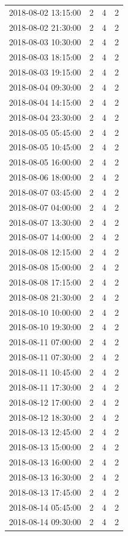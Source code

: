 \begin{tabular}{lrrr}
2018-08-02 13:15:00 & 2 & 4 & 2 \\
2018-08-02 21:30:00 & 2 & 4 & 2 \\
2018-08-03 10:30:00 & 2 & 4 & 2 \\
2018-08-03 18:15:00 & 2 & 4 & 2 \\
2018-08-03 19:15:00 & 2 & 4 & 2 \\
2018-08-04 09:30:00 & 2 & 4 & 2 \\
2018-08-04 14:15:00 & 2 & 4 & 2 \\
2018-08-04 23:30:00 & 2 & 4 & 2 \\
2018-08-05 05:45:00 & 2 & 4 & 2 \\
2018-08-05 10:45:00 & 2 & 4 & 2 \\
2018-08-05 16:00:00 & 2 & 4 & 2 \\
2018-08-06 18:00:00 & 2 & 4 & 2 \\
2018-08-07 03:45:00 & 2 & 4 & 2 \\
2018-08-07 04:00:00 & 2 & 4 & 2 \\
2018-08-07 13:30:00 & 2 & 4 & 2 \\
2018-08-07 14:00:00 & 2 & 4 & 2 \\
2018-08-08 12:15:00 & 2 & 4 & 2 \\
2018-08-08 15:00:00 & 2 & 4 & 2 \\
2018-08-08 17:15:00 & 2 & 4 & 2 \\
2018-08-08 21:30:00 & 2 & 4 & 2 \\
2018-08-10 10:00:00 & 2 & 4 & 2 \\
2018-08-10 19:30:00 & 2 & 4 & 2 \\
2018-08-11 07:00:00 & 2 & 4 & 2 \\
2018-08-11 07:30:00 & 2 & 4 & 2 \\
2018-08-11 10:45:00 & 2 & 4 & 2 \\
2018-08-11 17:30:00 & 2 & 4 & 2 \\
2018-08-12 17:00:00 & 2 & 4 & 2 \\
2018-08-12 18:30:00 & 2 & 4 & 2 \\
2018-08-13 12:45:00 & 2 & 4 & 2 \\
2018-08-13 15:00:00 & 2 & 4 & 2 \\
2018-08-13 16:00:00 & 2 & 4 & 2 \\
2018-08-13 16:30:00 & 2 & 4 & 2 \\
2018-08-13 17:45:00 & 2 & 4 & 2 \\
2018-08-14 05:45:00 & 2 & 4 & 2 \\
2018-08-14 09:30:00 & 2 & 4 & 2 \\

\end{tabular}
